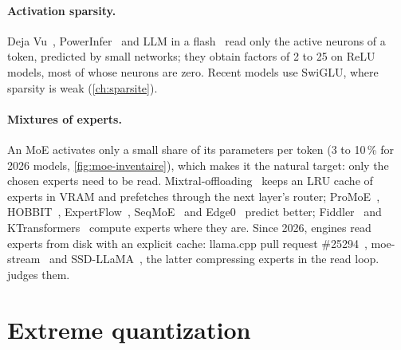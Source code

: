 \paragraph{Activation sparsity.} Deja Vu~\cite{dejavu2023}, PowerInfer~\cite{powerinfer2024,powerinfer2_2024} and LLM in a flash~\cite{llminflash2024} read only the active neurons of a token, predicted by small networks; they obtain factors of 2 to 25 on ReLU models, most of whose neurons are zero. Recent models use SwiGLU, where sparsity is weak (\cref{ch:sparsite}).

\paragraph{Mixtures of experts.} An MoE activates only a small share of its parameters per token (3 to 10\,\% for 2026 models, \cref{fig:moe-inventaire}), which makes it the natural target: only the chosen experts need to be read. Mixtral-offloading~\cite{mixtraloffload2023} keeps an LRU cache of experts in VRAM and prefetches through the next layer's router; ProMoE~\cite{promoe2024}, HOBBIT~\cite{hobbit2024}, ExpertFlow~\cite{expertflow2024}, SeqMoE~\cite{seqmoe2026} and Edge0~\cite{edge0_2026} predict better; Fiddler~\cite{fiddler2025} and KTransformers~\cite{ktransformers2025} compute experts where they are. Since 2026, engines read experts from disk with an explicit cache: llama.cpp pull request \#25294~\cite{llamapr25294}, moe-stream~\cite{moestream2026} and SSD-LLaMA~\cite{ssdllama2026}, the latter compressing experts in the read loop.  judges them.

\section{Extreme quantization}\label{sec:etat-quant}

